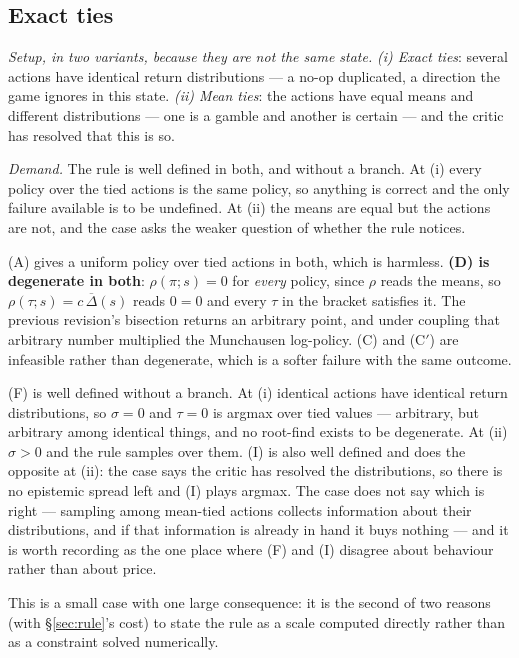 \documentclass{article}
\newcommand{\gapbar}{\overline{\Delta}}
\newcommand{\srank}{\sigma}
\begin{document}
\subsection{Exact ties}
\label{sec:c9}

\emph{Setup, in two variants, because they are not the same state.}
\emph{(i) Exact ties}: several actions have identical return distributions --- a no-op
duplicated, a direction the game ignores in this state.
\emph{(ii) Mean ties}: the actions have equal means and different distributions --- one is a
gamble and another is certain --- and the critic has resolved that this is so.

\emph{Demand.} The rule is well defined in both, and without a branch. At (i) every policy over
the tied actions is the same policy, so anything is correct and the only failure available is to
be undefined. At (ii) the means are equal but the actions are not, and the case asks the weaker
question of whether the rule notices.

(A) gives a uniform policy over tied actions in both, which is harmless. \textbf{(D) is
degenerate in both}: $\rho(\pi;s) = 0$ for \emph{every} policy, since $\rho$ reads the means, so
$\rho(\tau;s) = c\,\gapbar(s)$ reads $0 = 0$ and every $\tau$ in the bracket satisfies it. The
previous revision's bisection returns an arbitrary point, and under coupling that arbitrary
number multiplied the Munchausen log-policy. (C) and (C$'$) are infeasible rather than
degenerate, which is a softer failure with the same outcome.

(F) is well defined without a branch. At (i) identical actions have identical return
distributions, so $\srank = 0$ and $\tau = 0$ is argmax over tied values --- arbitrary, but
arbitrary among identical things, and no root-find exists to be degenerate. At (ii) $\srank > 0$
and the rule samples over them. (I) is also well defined and does the opposite at (ii): the case
says the critic has resolved the distributions, so there is no epistemic spread left and (I)
plays argmax. The case does not say which is right --- sampling among mean-tied actions collects
information about their distributions, and if that information is already in hand it buys nothing
--- and it is worth recording as the one place where (F) and (I) disagree about behaviour rather
than about price.

This is a small case with one large consequence: it is the second of two reasons (with
\S\ref{sec:rule}'s cost) to state the rule as a scale computed directly rather than as a
constraint solved numerically.
\end{document}
